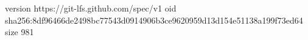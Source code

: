 version https://git-lfs.github.com/spec/v1
oid sha256:8df96466de2498bc77543d0914906b3ce9620959d13d154e51138a199f73ed64
size 981
